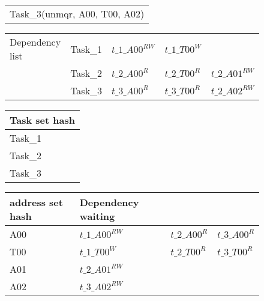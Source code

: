 \documentclass{article}
\begin{document}
\begin{figure}
\begin{minipage}{1.0\linewidth}
\begin{tabular}{l}
Task\_3(unmqr, A00, T00, A02)
\end{tabular}
\end{minipage}

\begin{minipage}{1.0\linewidth}
\begin{tabular}{l | l  l  l l}
Dependency list & Task\_1 & \cellcolor{LimeGreen} $t\_1\_A00^{RW}$ & \cellcolor{LimeGreen} $t\_1\_T00^{W}$&\\
                & Task\_2 & \cellcolor{RedOrange}$t\_2\_A00^{R}$ & \cellcolor{RedOrange}$t\_2\_T00^{R}$ & \cellcolor{LimeGreen}$t\_2\_A01^{RW}$\\
                & Task\_3 & \cellcolor{RedOrange}$t\_3\_A00^{R}$ & \cellcolor{RedOrange}$t\_3\_T00^{R}$ & \cellcolor{LimeGreen}$t\_2\_A02^{RW}$\\
\end{tabular}
\end{minipage}

\begin{minipage}{1.0\linewidth}
\begin{tabular}{l}
Task set hash\\
\hline
\cellcolor{LimeGreen}Task\_1\\
\cellcolor{RedOrange}Task\_2\\
\cellcolor{RedOrange}Task\_3\\
\end{tabular}
\end{minipage}

\begin{minipage}{1.0\linewidth}
\begin{tabular}{l | l l l}
address set hash& Dependency waiting& &\\
\hline
A00 & \cellcolor{LimeGreen}$t\_1\_A00^{RW}$ & \cellcolor{RedOrange}$t\_2\_A00^{R}$ & \cellcolor{RedOrange} $t\_3\_A00^{R}$\\
T00 & \cellcolor{LimeGreen}$t\_1\_T00^{W}$ & \cellcolor{RedOrange} $t\_2\_T00^{R}$ & \cellcolor{RedOrange} $t\_3\_T00^{R}$\\
A01 & \cellcolor{LimeGreen}$t\_2\_A01^{RW}$ & &\\
A02 & \cellcolor{LimeGreen}$t\_3\_A02^{RW}$ & &\\
\end{tabular}
\end{minipage}


\end{figure}
\end{document}
